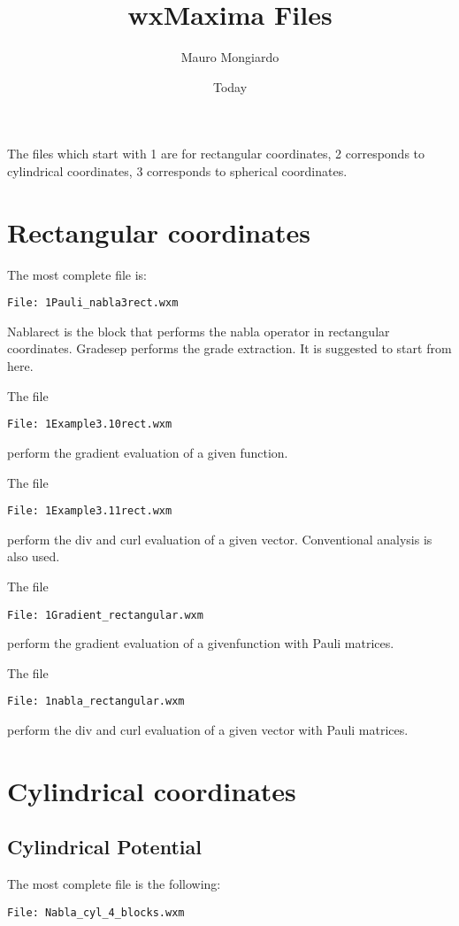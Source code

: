 \documentclass[]{article}
\begin{document}
\title{wxMaxima Files}
\author{Mauro Mongiardo}
\date{Today}
\maketitle


The files which start with 1 are for rectangular coordinates, 2 corresponds to cylindrical coordinates, 3 corresponds to spherical coordinates.


\section{Rectangular coordinates}


The most complete file is:
\begin{verbatim}
File: 1Pauli_nabla3rect.wxm
\end{verbatim}
Nablarect is the block that performs the nabla operator in rectangular coordinates.
Gradesep performs the grade extraction. 
It is suggested to start from here.

The file
\begin{verbatim}
File: 1Example3.10rect.wxm
\end{verbatim}
perform the gradient evaluation of a given function.

The file
\begin{verbatim}
File: 1Example3.11rect.wxm
\end{verbatim}
perform the div and curl evaluation of a given vector.
Conventional analysis is also used. 

The file
\begin{verbatim}
File: 1Gradient_rectangular.wxm
\end{verbatim}
perform the gradient evaluation of a givenfunction with Pauli matrices.
 
 
The file
\begin{verbatim}
File: 1nabla_rectangular.wxm
\end{verbatim}
perform the div and curl evaluation of a given vector with Pauli matrices.
 



\section{Cylindrical coordinates}

\subsection{Cylindrical Potential}
The most complete file is the following:
\begin{verbatim}
File: Nabla_cyl_4_blocks.wxm
\end{verbatim}
\end{document}
